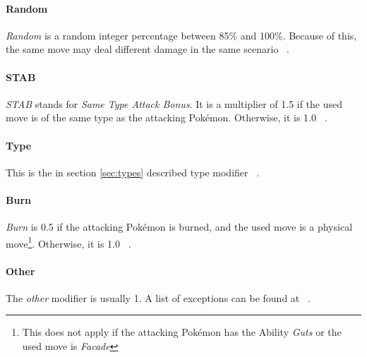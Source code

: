 \paragraph{Random}
\textit{Random} is a random integer percentage between 85\% and 100\%. Because of this, the same move
may deal different damage in the same scenario ~\autocite{Bulbapedia:Damage}.

\paragraph{STAB}
\textit{STAB} stands for \textit{Same Type Attack Bonus}. It is a multiplier of 1.5 if the used move
is of the same type as the attacking Pokémon. Otherwise, it is 1.0 ~\autocite{Bulbapedia:Damage}.

\paragraph{Type}
This is the in section \ref{sec:types} described type modifier ~\autocite{Bulbapedia:Damage}.

\paragraph{Burn}
\textit{Burn} is 0.5 if the attacking Pokémon is burned, and the used move
is a physical move\footnote{This does not apply if the attacking Pokémon has the Ability \textit{Guts}
or the used move is \textit{Facade}}. Otherwise, it is 1.0 ~\autocite{Bulbapedia:Damage}.

\paragraph{Other}
The \textit{other} modifier is usually 1. A list of exceptions can be found at ~\autocite{Bulbapedia:Damage}.


